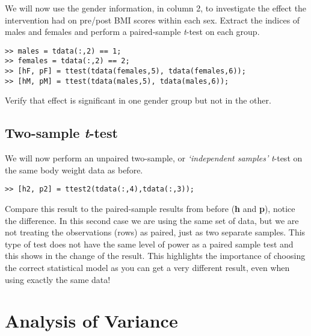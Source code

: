 \documentclass[12pt,a4paper]{article}
\begin{document}
We will now use the gender information, in column 2, to investigate the effect the intervention had on pre/post BMI scores within each sex.  
Extract the indices of males and females and perform a paired-sample \emph{t}-test on each group.
\begin{lstlisting}[style=Matlab-editor]
>> males = tdata(:,2) == 1;
>> females = tdata(:,2) == 2;	
>> [hF, pF] = ttest(tdata(females,5), tdata(females,6));
>> [hM, pM] = ttest(tdata(males,5), tdata(males,6));
\end{lstlisting}
Verify that effect is significant in one gender group but not in the other.  

\subsection{Two-sample \emph{t}-test}
We will now perform an unpaired two-sample, or \emph{`independent samples'} \emph{t}-test on the same body weight data as before.
\begin{lstlisting}[style=Matlab-editor]		
>> [h2, p2] = ttest2(tdata(:,4),tdata(:,3));
\end{lstlisting}
Compare this result to the paired-sample results from before (\textbf{h} and \textbf{p}), notice the difference.  
In this second case we are using the same set of data, but we are not treating the observations (rows) as paired, just as two separate samples.  
This type of test does not have the same level of power as a paired sample test and this shows in the change of the result.  
This highlights the importance of choosing the correct statistical model as you can get a very different result, even when using exactly the same data!

\section{Analysis of Variance}
\end{document}
